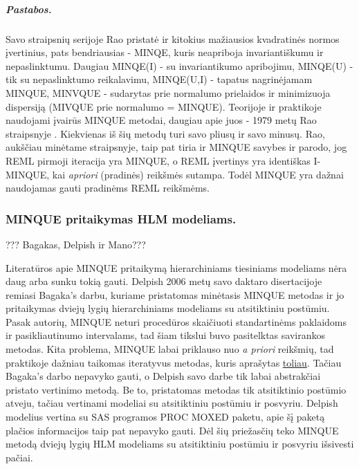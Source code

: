 \documentclass[12pt,a4paper]{article}
\begin{document}
\subparagraph{Pastabos.} Savo straipsnių serijoje Rao pristatė ir kitokius mažiausios kvadratinės normos įvertinius, pats bendriausias - MINQE, kuris neapriboja invariantiškumu ir nepaslinktumu. Daugiau MINQE(I) - su invariantikumo apribojimu, MINQE(U) - tik su nepaslinktumo reikalavimu, MINQE(U,I) - tapatus nagrinėjamam MINQUE, MINVQUE - sudarytas prie normalumo prielaidos ir minimizuoja dispersiją (MIVQUE prie normalumo = MINQUE). Teorijoje ir praktikoje naudojami įvairūs MINQUE metodai, daugiau apie juos - 1979 metų Rao straipsnyje \cite{minquereml3}. Kiekvienas iš šių metodų turi savo pliusų ir savo minusų. Rao, aukščiau minėtame straipsnyje, taip pat tiria ir MINQUE savybes ir parodo, jog REML pirmoji iteracija yra MINQUE, o REML įvertinys yra identiškas I-MINQUE, kai \textit{apriori} (pradinės) reikšmės sutampa. Todėl MINQUE yra dažnai naudojamas gauti pradinėms REML reikšmėms.


\subsubsection{MINQUE pritaikymas HLM modeliams.}
??? Bagakas, Delpish ir Mano???


 Literatūros apie MINQUE pritaikymą hierarchiniams tiesiniams modeliams nėra daug arba sunku tokią gauti. Delpish\cite{delpish} 2006 metų savo daktaro disertacijoje remiasi Bagaka's\cite{bagaka} darbu, kuriame pristatomas minėtasis MINQUE metodas ir jo pritaikymas dviejų lygių hierarchiniams modeliams su atsitiktiniu postūmiu. Pasak autorių, MINQUE neturi procedūros skaičiuoti standartinėms paklaidoms ir pasikliautinumo intervalams, tad šiam tikslui buvo pasitelktas savirankos metodas. Kita problema, MINQUE labai priklauso nuo \textit{a priori} reikšmių, tad praktikoje dažniau taikomas iteratyvus metodas, kuris aprašytas \hyperlink{iminque}{toliau}. Tačiau Bagaka's darbo nepavyko gauti, o Delpish savo darbe tik labai abstrakčiai pristato vertinimo metodą. Be to, pristatomas metodas tik atsitiktinio postūmio atveju, tačiau vertinami modeliai su atsitiktiniu postūmiu ir posvyriu. Delpish modelius vertina su SAS programos PROC MOXED paketu, apie šį paketą plačios informacijos taip pat nepavyko gauti. Dėl šių priežasčių teko MINQUE metodą dviejų lygių HLM modeliams su atsitiktiniu postūmiu ir posvyriu išsivesti pačiai.
\end{document}
